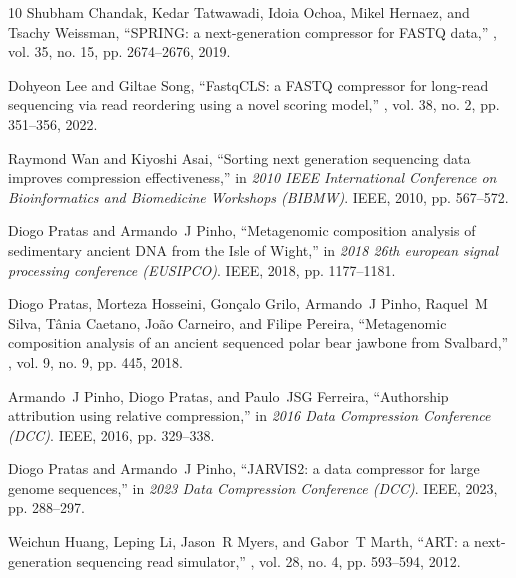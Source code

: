 \documentclass[smallabstract,smallcaptions]{dccpaper}
\begin{document}
\begin{thebibliography}{10}
Shubham Chandak, Kedar Tatwawadi, Idoia Ochoa, Mikel Hernaez, and Tsachy
  Weissman,
\newblock ``{SPRING: a next-generation compressor for FASTQ data},''
, vol. 35, no. 15, pp. 2674--2676, 2019.

Dohyeon Lee and Giltae Song,
\newblock ``{FastqCLS: a FASTQ compressor for long-read sequencing via read
  reordering using a novel scoring model},''
, vol. 38, no. 2, pp. 351--356, 2022.

Raymond Wan and Kiyoshi Asai,
\newblock ``{Sorting next generation sequencing data improves compression
  effectiveness},''
\newblock in {\em 2010 IEEE International Conference on Bioinformatics and
  Biomedicine Workshops (BIBMW)}. IEEE, 2010, pp. 567--572.

Diogo Pratas and Armando~J Pinho,
\newblock ``{Metagenomic composition analysis of sedimentary ancient DNA from
  the Isle of Wight},''
\newblock in {\em 2018 26th european signal processing conference (EUSIPCO)}.
  IEEE, 2018, pp. 1177--1181.

Diogo Pratas, Morteza Hosseini, Gon{\c{c}}alo Grilo, Armando~J Pinho, Raquel~M
  Silva, T{\^a}nia Caetano, Jo{\~a}o Carneiro, and Filipe Pereira,
\newblock ``{Metagenomic composition analysis of an ancient sequenced polar
  bear jawbone from Svalbard},''
, vol. 9, no. 9, pp. 445, 2018.

Armando~J Pinho, Diogo Pratas, and Paulo~JSG Ferreira,
\newblock ``{Authorship attribution using relative compression},''
\newblock in {\em 2016 Data Compression Conference (DCC)}. IEEE, 2016, pp.
  329--338.

Diogo Pratas and Armando~J Pinho,
\newblock ``{JARVIS2: a data compressor for large genome sequences},''
\newblock in {\em 2023 Data Compression Conference (DCC)}. IEEE, 2023, pp.
  288--297.

Weichun Huang, Leping Li, Jason~R Myers, and Gabor~T Marth,
\newblock ``{ART: a next-generation sequencing read simulator},''
, vol. 28, no. 4, pp. 593--594, 2012.

\end{thebibliography}
\end{document}
